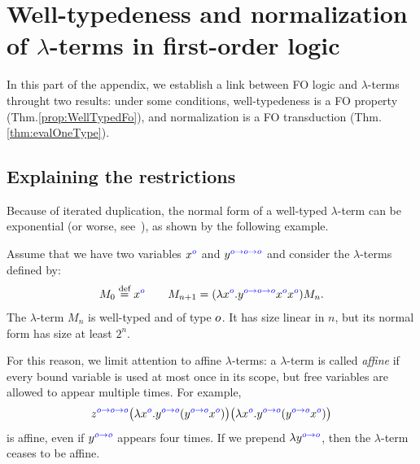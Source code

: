 \section{Well-typedeness and normalization of $\lambda$-terms in first-order logic}
\label{sec:eval}

\newcommand{\lambdaterm}{$\lambda$-term }
\newcommand{\lambdaterms}{$\lambda$-terms }

\newcommand{\NonLinTerms}[2]{\Lambda_{#1} #2}
\newcommand{\LinTerms}[2]{\mathsf{Lin}_{#1} #2}

 \newcommand{\rlambda}{\ranked{\Lambda}}
 \newcommand{\rlambdalin}{\ranked{\Lambda^{\sf{lin}}}}
 \newcommand{\rlambdathin}{\ranked{\Lambda^{\sf{thin}}}}


\newcommand{\thinterm}[1]{\ranked{\mathsf{Thin}_{#1}}}

In this part of the appendix, we establish a link between FO logic and $\lambda$-terms throught two results: under some conditions, well-typedeness is a FO property (Thm.\ref{prop:WellTypedFo}), and normalization is a FO transduction (Thm.\ref{thm:evalOneType}). 

\subsection{Explaining the restrictions}

 Because of iterated duplication, the normal form of a well-typed $\lambda$-term can be exponential (or worse, see~\cite[Section 3.6]{sorensen_lectures_2006}), as shown by the following example.
 
\begin{example}\label{ex:exponential}
    Assume that we have two variables ${x}^{\color{blue}{o}}$ and ${y}^{\color{blue}{o\to o\to o}}$ and consider the $\lambda$-terms defined by:
    \begin{align*}
        M_0 \stackrel{\text{def}}= {x}^{\color{blue}{o}} \qquad M_{n+1} = (\lambda {x}^{\color{blue}{o}} . {y}^{\color{blue}{o\to o\to o}}  {x}^{\color{blue}{o}} {x}^{\color{blue}{o}})M_n.
    \end{align*}
    The $\lambda$-term $M_n$ is well-typed and of type $o$. It has size linear in $n$, but its normal form has size at least $2^n$. 
\end{example}

 For this reason, we  limit attention to affine $\lambda$-terms: a $\lambda$-term is called \emph{affine} if every bound variable is used at most once in its scope, but free variables are allowed to appear multiple times.  For example, 
\begin{align*}
{z}^{\color{blue}{o\to o\to o}} \big(\lambda {x}^{\color{blue}{o}}.  {y}^{\color{blue}{o\to o}} ({y}^{\color{blue}{o\to o}}  {x}^{\color{blue}{o}})\big) \big(\lambda {x}^{\color{blue}{o}}.  {y}^{\color{blue}{o\to o}} ({y}^{\color{blue}{o\to o}}  {x}^{\color{blue}{o}})\big)
\end{align*}
is affine, even if ${y}^{\color{blue}{o\to o}}$ appears four times. If we prepend $\lambda {y}^{\color{blue}{o\to o}}$, then the $\lambda$-term ceases to be affine.

